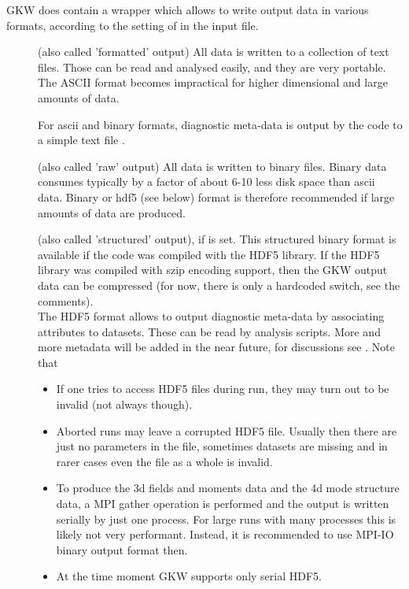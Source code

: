 GKW does contain a wrapper which allows to write output data
in various formats, according to the setting of  in
the input file.
\begin{description}
\item[] (also called 'formatted' output) All
  data is written to a collection of text files. Those can be read and
  analysed easily, and they are very portable. The ASCII format
  becomes impractical for higher dimensional and large amounts of data.

  For ascii and binary formats, diagnostic meta-data is output by the
  code to a simple text file .

\item[] (also called 'raw' output) All data
  is written to binary files. Binary data consumes typically by a
  factor of about 6-10 less disk space than ascii data. Binary or hdf5
  (see below) format is therefore recommended if large amounts of data
  are produced.
\item[] (also called 'structured' output), if
   is set. This structured binary format is
  available if the code was compiled with the HDF5 library. If the
  HDF5 library was compiled with szip encoding support, then the GKW
  output data can be compressed (for now, there is only a hardcoded
  switch, see the comments).
  \\
  The HDF5 format allows to output diagnostic meta-data by associating
  attributes to datasets. These can be read by analysis
  scripts.  More and more metadata will be added in the near future, for
  discussions see . Note that
  \begin{itemize}
  \item If one tries to access HDF5 files during run, they may turn
    out to be invalid (not always though).
  \item Aborted runs may leave a corrupted HDF5 file. Usually then
    there are just no parameters in the file, sometimes datasets are
    missing and in rarer cases even the file as a whole is invalid.
  \item To produce the 3d fields and moments data and the 4d mode
    structure data, a MPI gather operation is performed and the output
    is written serially by just one process. For large runs with many
    processes this is likely not very performant. Instead, it is
    recommended to use MPI-IO binary output format then.
  \item At the time moment GKW supports only serial
    HDF5.
  \end{itemize}
\end{description}

